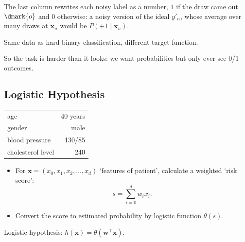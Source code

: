The last column rewrites each noisy label as a number, \(1\) if the draw came
out \(\dmark{o}\) and \(0\) otherwise: a noisy version of the ideal \(y'_n\),
whose average over many draws at \(\bm{x}_n\) would be \(P(+1 \mid
\bm{x}_n)\).

\begin{moral}
    Same data as hard binary classification, different target function.
\end{moral}

So the task is harder than it looks: we want probabilities but only ever see
0/1 outcomes.

\subsection{Logistic Hypothesis}

\begin{center}
    \small
    \begin{tabular}{@{}|l|r|@{}}
        \hline
        age & 40 years\\
        gender & male\\
        blood pressure & 130/85\\
        cholesterol level & 240\\
        \hline
    \end{tabular}
\end{center}

\begin{center}
    \begin{minipage}[c]{0.6\textwidth}
        \begin{itemize}
            \item For \(\bm{x} = (x_0, x_1, x_2, \dots , x_d)\) `features of
                patient', calculate a weighted `risk score':
                \[
                    s = \sum_{i=0}^{d} w_i x_i .
                \]
            \item Convert the score to estimated probability by logistic
                function \(\theta(s)\).
        \end{itemize}
    \end{minipage}%
    \begin{minipage}[c]{0.36\textwidth}
        \centering
        \thetacurve
    \end{minipage}
\end{center}

\begin{moral}
    Logistic hypothesis: \(h(\bm{x}) = \theta(\bm{w}^\top \bm{x})\).
\end{moral}

